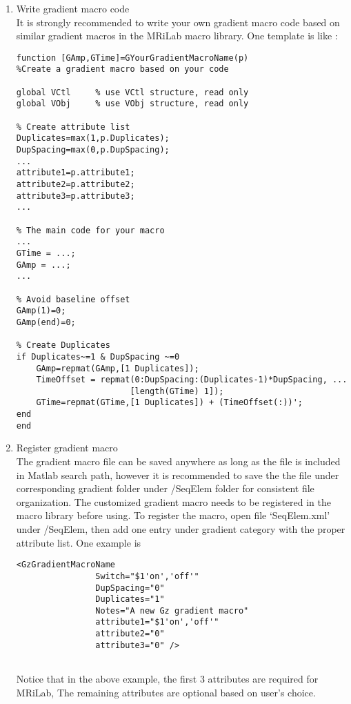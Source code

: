 \documentclass{book}%
\begin{document}
\begin{enumerate}

\item Write gradient macro code \\

It is strongly recommended to write your own gradient macro code based on similar gradient macros in the MRiLab macro library. One template is like :

\begin{verbatim}
function [GAmp,GTime]=GYourGradientMacroName(p)
%Create a gradient macro based on your code

global VCtl     % use VCtl structure, read only
global VObj     % use VObj structure, read only

% Create attribute list
Duplicates=max(1,p.Duplicates);
DupSpacing=max(0,p.DupSpacing);
...
attribute1=p.attribute1;
attribute2=p.attribute2;
attribute3=p.attribute3;
...

% The main code for your macro
...
GTime = ...;
GAmp = ...;
...

% Avoid baseline offset
GAmp(1)=0;
GAmp(end)=0;

% Create Duplicates
if Duplicates~=1 & DupSpacing ~=0
    GAmp=repmat(GAmp,[1 Duplicates]);
    TimeOffset = repmat(0:DupSpacing:(Duplicates-1)*DupSpacing, ...
                       [length(GTime) 1]);
    GTime=repmat(GTime,[1 Duplicates]) + (TimeOffset(:))';
end
end
\end{verbatim}

\item Register gradient macro \\

The gradient macro file can be saved anywhere as long as the file is included in Matlab search path, however it is recommended to save the the file under corresponding gradient folder under /SeqElem folder for consistent file organization. The customized gradient macro needs to be registered in the macro library before using. To register the macro, open file `SeqElem.xml' under /SeqElem, then add one entry under gradient category with the proper attribute list. One example is

\begin{verbatim}
<GzGradientMacroName  
				Switch="$1'on','off'" 
				DupSpacing="0" 
				Duplicates="1" 
				Notes="A new Gz gradient macro" 
				attribute1="$1'on','off'" 
				attribute2="0" 
				attribute3="0" />
				
\end{verbatim}

Notice that in the above example, the first 3 attributes are required for MRiLab, The remaining attributes are optional based on user's choice.

\end{enumerate}
\end{document}
